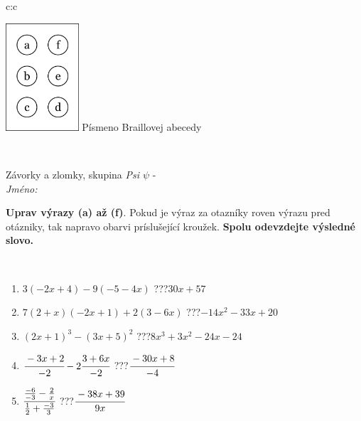 \documentclass[10pt]{report}
\begin{document}
\begin{tabular}{c:c}
\begin{minipage}[c][104.5mm][t]{0.5\linewidth}
\begin{center}
\begin{minipage}{0.20\linewidth}
\begin{center}
\includegraphics[height=40mm]{../images/braille.png}
{\small Písmeno Braillovej abecedy}
\end{center}
\end{minipage}
\end{center}
\end{minipage}
\\ \hdashline
\begin{minipage}[c][104.5mm][t]{0.5\linewidth}
\begin{center}
\vspace{7mm}
{\huge Závorky a zlomky, skupina \textit{Psi $\psi$} -}\\[5mm]
\textit{Jméno:}\phantom{xxxxxxxxxxxxxxxxxxxxxxxxxxxxxxxxxxxxxxxxxxxxxxxxxxxxxxxxxxxxxxxxx}\\[5mm]
\begin{minipage}{0.95\linewidth}
\begin{center}
\textbf{Uprav výrazy (a) až (f)}. Pokud je výraz za otazníky roven výrazu pred otázniky, tak napravo obarvi príslušející kroužek. \textbf{Spolu odevzdejte výsledné slovo.}
\end{center}
\end{minipage}
\\[1mm]
\begin{minipage}{0.79\linewidth}
\begin{center}
\begin{varwidth}{\linewidth}
\begin{enumerate}
\normalsize
\item $3(-2x+4)-9(-5-4x)$\quad \dotfill\; ???\;\dotfill \quad $30x+57$
\item $7(2+x)(-2x+1)+2(3-6x)$\quad \dotfill\; ???\;\dotfill \quad $-14x^2-33x+20$
\item $(2x+1)^3-(3x+5)^2$\quad \dotfill\; ???\;\dotfill \quad $8x^3+3x^2-24x-24$
\item $\cfrac{-3x+2}{-2}-2\cfrac{3+6x}{-2}$\quad \dotfill\; ???\;\dotfill \quad $\cfrac{-30x+8}{-4}$
\item $\cfrac{\frac{-6}{-3}-\frac{2}{x}}{\frac{1}{2}+\frac{-3}{3}}$\quad \dotfill\; ???\;\dotfill \quad $\cfrac{-38x+39}{9x}$

\end{enumerate}
\end{varwidth}
\end{center}
\end{minipage}
\end{center}
\end{minipage}
\end{tabular}
\end{document}
